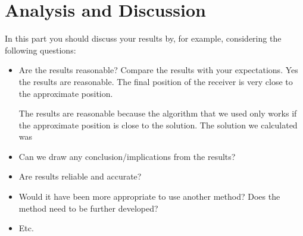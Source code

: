 \section{Analysis and Discussion} %
\label{sec:analysis_and_discussion}
In this part you should discuss your results by, for example, considering the following questions:
\begin{itemize}
	\item Are the results reasonable? Compare the results with your expectations.
	Yes the results are reasonable.  The final position of the receiver is very close to the approximate position.


	
	The results are reasonable because the algorithm that we used only works if the approximate position is close to the solution.  The solution we calculated was 
	\item Can we draw any conclusion/implications from the results?
	\item Are results reliable and accurate?
	\item Would it have been more appropriate to use another method? Does the method need to be further developed?
	\item Etc.
\end{itemize}

